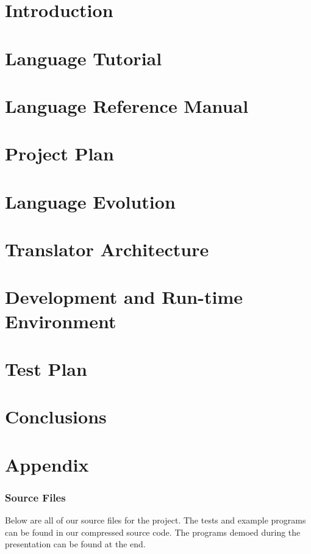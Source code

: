 \documentclass[11pt]{article}
\begin{document}


\newpage
\tableofcontents
\newpage
\part{Introduction}


\part{Language Tutorial}


\part{Language Reference Manual}


\part{Project Plan}



\part{Language Evolution}


\part{Translator Architecture}


\part{Development and Run-time Environment}


\part{Test Plan}


\part{Conclusions}


\part{Appendix}
\section{Source Files}
Below are all of our source files for the project. The tests and example programs can be found in our compressed source code. The programs demoed during the presentation can be found at the end.
\end{document}
